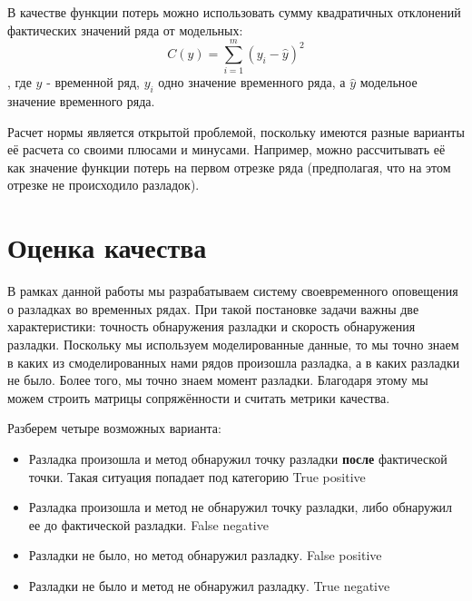 \documentclass[%
12pt,
master,  %
natbib,      %
subf,        %
substylefile = spbu.rtx,
href,        %
colorlinks,  %
]{disser}
\begin{document}
В качестве функции потерь можно использовать сумму квадратичных отклонений фактических значений ряда от модельных:
$$ C(y) = \sum_{i=1}^m(y_i - \hat{y})^2$$
, где $ y $ - временной ряд, $ y_i $ одно значение временного ряда, а $\hat{y}$ модельное значение временного ряда.

Расчет нормы является открытой проблемой, поскольку имеются разные варианты её расчета со своими плюсами и минусами.
Например, можно рассчитывать её как значение функции потерь на первом отрезке ряда (предполагая, что на этом отрезке не происходило разладок).

\section{Оценка качества}

В рамках данной работы мы разрабатываем систему своевременного оповещения о разладках во временных рядах. При такой постановке задачи важны две характеристики: точность обнаружения разладки и скорость обнаружения разладки. Поскольку мы используем моделированные данные, то мы точно знаем в каких из смоделированных нами рядов произошла разладка, а в каких разладки не было. Более того, мы точно знаем момент разладки. Благодаря этому мы можем строить матрицы сопряжённости и считать метрики качества.

Разберем четыре возможных варианта:
\begin{itemize}
	\item Разладка произошла и метод обнаружил точку разладки \textbf{после} фактической точки. Такая ситуация попадает под категорию True positive
	\item Разладка произошла и метод не обнаружил точку разладки, либо обнаружил ее до фактической разладки. False negative
	\item Разладки не было, но метод обнаружил разладку. False positive
	\item Разладки не было и метод не обнаружил разладку. True negative
\end{itemize}
\end{document}
